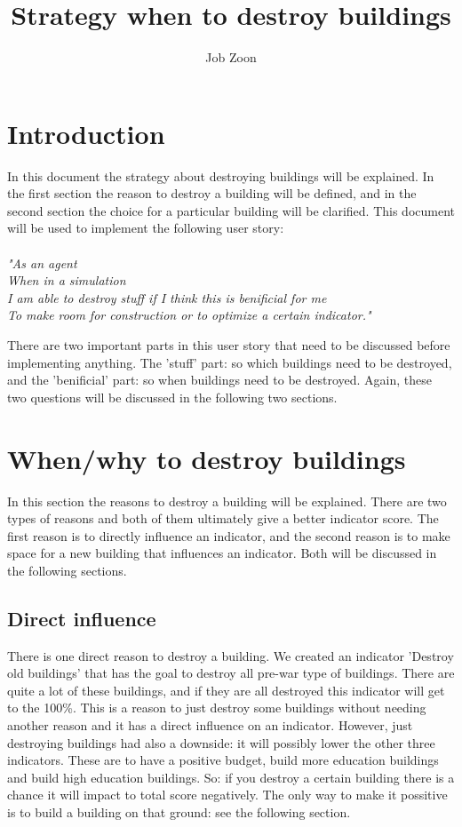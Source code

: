 \documentclass{article}
\author{Job Zoon}
\title{Strategy when to destroy buildings}
\begin{document}

\maketitle{}
\newpage{}

\section{Introduction}
In this document the strategy about destroying buildings will be explained. In the first section the reason to destroy a building will be defined, and in the second section the choice for a particular building will be clarified. This document will be used to implement the following user story:\\
\\
\textit{"As an agent\\
When in a simulation\\
I am able to destroy stuff if I think 
this is benificial for me\\
To make room for construction or to 
optimize a certain indicator."\\}

There are two important parts in this user story that need to be discussed before implementing anything. The 'stuff' part: so which buildings need to be destroyed, and the 'benificial' part: so when buildings need to be destroyed. Again, these two questions will be discussed in the following two sections.

\section{When/why to destroy buildings}
In this section the reasons to destroy a building will be explained. There are two types of reasons and both of them ultimately give a better indicator score. The first reason is to directly influence an indicator, and the second reason is to make space for a new building that influences an indicator. Both will be discussed in the following sections.

\subsection{Direct influence}
There is one direct reason to destroy a building. We created an indicator 'Destroy old buildings' that has the goal to destroy all pre-war type of buildings. There are quite a lot of these buildings, and if they are all destroyed this indicator will get to the 100\%. This is a reason to just destroy some buildings without needing another reason and it has a direct influence on an indicator. However, just destroying buildings had also a downside: it will possibly lower the other three indicators. These are to have a positive budget, build more education buildings and build high education buildings. So: if you destroy a certain building there is a chance it will impact to total score negatively. The only way to make it possitive is to build a building on that ground: see the following section.
\end{document}
